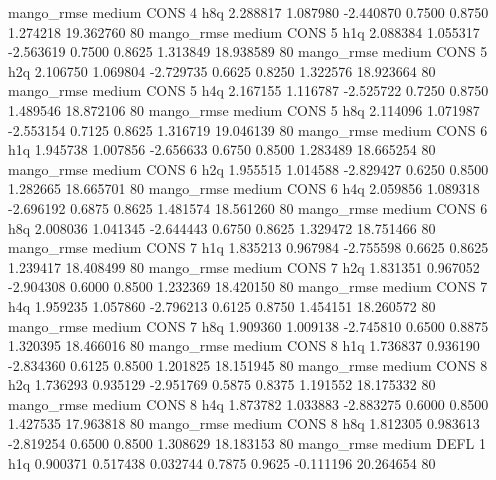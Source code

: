        mango_rmse     medium     CONS                 4                  h8q  2.288817 1.087980 -2.440870 0.7500 0.8750  1.274218   19.362760 80
       mango_rmse     medium     CONS                 5                  h1q  2.088384 1.055317 -2.563619 0.7500 0.8625  1.313849   18.938589 80
       mango_rmse     medium     CONS                 5                  h2q  2.106750 1.069804 -2.729735 0.6625 0.8250  1.322576   18.923664 80
       mango_rmse     medium     CONS                 5                  h4q  2.167155 1.116787 -2.525722 0.7250 0.8750  1.489546   18.872106 80
       mango_rmse     medium     CONS                 5                  h8q  2.114096 1.071987 -2.553154 0.7125 0.8625  1.316719   19.046139 80
       mango_rmse     medium     CONS                 6                  h1q  1.945738 1.007856 -2.656633 0.6750 0.8500  1.283489   18.665254 80
       mango_rmse     medium     CONS                 6                  h2q  1.955515 1.014588 -2.829427 0.6250 0.8500  1.282665   18.665701 80
       mango_rmse     medium     CONS                 6                  h4q  2.059856 1.089318 -2.696192 0.6875 0.8625  1.481574   18.561260 80
       mango_rmse     medium     CONS                 6                  h8q  2.008036 1.041345 -2.644443 0.6750 0.8625  1.329472   18.751466 80
       mango_rmse     medium     CONS                 7                  h1q  1.835213 0.967984 -2.755598 0.6625 0.8625  1.239417   18.408499 80
       mango_rmse     medium     CONS                 7                  h2q  1.831351 0.967052 -2.904308 0.6000 0.8500  1.232369   18.420150 80
       mango_rmse     medium     CONS                 7                  h4q  1.959235 1.057860 -2.796213 0.6125 0.8750  1.454151   18.260572 80
       mango_rmse     medium     CONS                 7                  h8q  1.909360 1.009138 -2.745810 0.6500 0.8875  1.320395   18.466016 80
       mango_rmse     medium     CONS                 8                  h1q  1.736837 0.936190 -2.834360 0.6125 0.8500  1.201825   18.151945 80
       mango_rmse     medium     CONS                 8                  h2q  1.736293 0.935129 -2.951769 0.5875 0.8375  1.191552   18.175332 80
       mango_rmse     medium     CONS                 8                  h4q  1.873782 1.033883 -2.883275 0.6000 0.8500  1.427535   17.963818 80
       mango_rmse     medium     CONS                 8                  h8q  1.812305 0.983613 -2.819254 0.6500 0.8500  1.308629   18.183153 80
       mango_rmse     medium     DEFL                 1                  h1q  0.900371 0.517438  0.032744 0.7875 0.9625 -0.111196   20.264654 80
